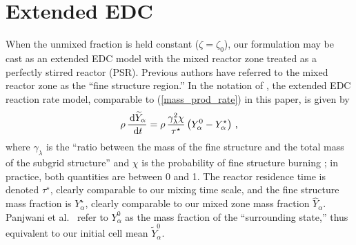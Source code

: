 \section{Extended EDC}

When the unmixed fraction is held constant ($\zeta = \zeta_0$), our formulation may be cast as an extended EDC model with the mixed reactor zone treated as a perfectly stirred reactor (PSR).  Previous authors  \cite{Chen:1,Panjwani:2010,Lilleberg:2010} have referred to the mixed reactor zone as the ``fine structure region.'' In the notation of \cite{Panjwani:2010}, the extended EDC reaction rate model, comparable to (\ref{mass_prod_rate}) in this paper, is given by
\begin{equation}
\label{eq:panjwani_edc}
\rho \, \frac{\,\mathrm{d} \widetilde{Y}_\alpha}{\,\mathrm{d} t} = \rho \, \frac{\gamma_\lambda^2 \chi}{\tau^\star} \left( Y_\alpha^0 - Y_\alpha^\star \right) \,\mbox{,}
\end{equation}
where $\gamma_\lambda$ is the ``ratio between the mass of the fine structure and the total mass of the subgrid structure'' and $\chi$ is the probability of fine structure burning \cite{Panjwani:2010}; in practice, both quantities are between 0 and 1.  The reactor residence time is denoted $\tau^\star$, clearly comparable to our mixing time scale, and the fine structure mass fraction is $Y_\alpha^\star$, clearly comparable to our mixed zone mass fraction $\hat{Y}_\alpha$.  Panjwani et al.~\cite{Panjwani:2010} refer to $Y_\alpha^0$ as the mass fraction of the ``surrounding state,'' thus equivalent to our initial cell mean $\widetilde{Y}_\alpha^0$.

